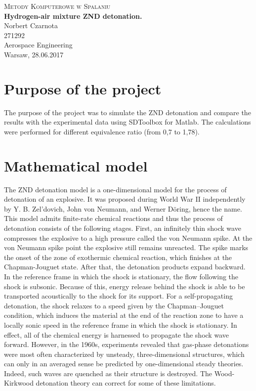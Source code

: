 \documentclass[11pt]{article}
\begin{document}
\begin{titlepage}

	\begin{center}

    


	\huge{\textsc{Metody Komputerowe w Spalaniu}} \\
[50mm]

    \LARGE{\textbf{Hydrogen-air mixture ZND detonation.
}} \\
	[50mm]
	\Large{Norbert Czarnota}\\
    \Large{271292}\\
    [25mm]
    \large{Aerospace Engineering}\\
    [80mm]
    \large{Warsaw, 28.06.2017}\\
    \end{center}
    
\end{titlepage}

\newpage



\section{Purpose of the project}
The purpose of the project was to simulate the ZND detonation and compare the results with the experimental data using SDToolbox for Matlab. The calculations were performed for different equivalence ratio (from 0,7 to 1,78).

\section{Mathematical model}
The ZND detonation model is a one-dimensional model for the process of detonation of an explosive. It was proposed during World War II independently by Y. B. Zel'dovich, John von Neumann, and Werner Döring, hence the name.
This model admits finite-rate chemical reactions and thus the process of detonation consists of the following stages. First, an infinitely thin shock wave compresses the explosive to a high pressure called the von Neumann spike. At the von Neumann spike point the explosive still remains unreacted. The spike marks the onset of the zone of exothermic chemical reaction, which finishes at the Chapman-Jouguet state. After that, the detonation products expand backward. In the reference frame in which the shock is stationary, the flow following the shock is subsonic. Because of this, energy release behind the shock is able to be transported acoustically to the shock for its support. For a self-propagating detonation, the shock relaxes to a speed given by the Chapman–Jouguet condition, which induces the material at the end of the reaction zone to have a locally sonic speed in the reference frame in which the shock is stationary. In effect, all of the chemical energy is harnessed to propagate the shock wave forward.
However, in the 1960s, experiments revealed that gas-phase detonations were most often characterized by unsteady, three-dimensional structures, which can only in an averaged sense be predicted by one-dimensional steady theories. Indeed, such waves are quenched as their structure is destroyed. The Wood-Kirkwood detonation theory can correct for some of these limitations. 
\end{document}
